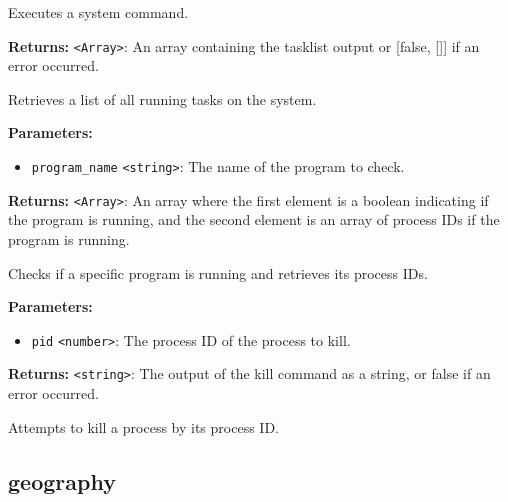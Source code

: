 \documentclass[12pt,a4paper]{article}
\begin{document}
\noindent Executes a system command.

\vspace{5mm}
\noindent {}


\noindent \textbf{Returns:} \texttt{<Array>}: An array containing the tasklist output or [false, []] if an error occurred.

\noindent Retrieves a list of all running tasks on the system.

\vspace{5mm}
\noindent {}


\noindent \textbf{Parameters:}
\begin{itemize}
  \item \texttt{program\_name} \texttt{<string>}: The name of the program to check.
\end{itemize}

\noindent \textbf{Returns:} \texttt{<Array>}: An array where the first element is a boolean indicating if the program is running, 
                 and the second element is an array of process IDs if the program is running.

\noindent Checks if a specific program is running and retrieves its process IDs.

\vspace{5mm}
\noindent {}


\noindent \textbf{Parameters:}
\begin{itemize}
  \item \texttt{pid} \texttt{<number>}: The process ID of the process to kill.
\end{itemize}

\noindent \textbf{Returns:} \texttt{<string>}: The output of the kill command as a string, or false if an error occurred.

\noindent Attempts to kill a process by its process ID.


\subsection{geography}
\vspace{5mm}
\noindent {}
\end{document}
